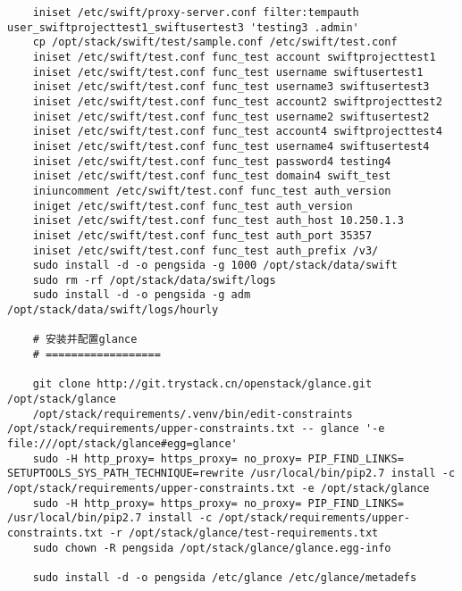 \documentclass[a4paper,left=1.5cm,right=1.5cm,11pt]{article}
\begin{document}
\begin{lstlisting}
    iniset /etc/swift/proxy-server.conf filter:tempauth user_swiftprojecttest1_swiftusertest3 'testing3 .admin'
	cp /opt/stack/swift/test/sample.conf /etc/swift/test.conf
    iniset /etc/swift/test.conf func_test account swiftprojecttest1
    iniset /etc/swift/test.conf func_test username swiftusertest1
    iniset /etc/swift/test.conf func_test username3 swiftusertest3
    iniset /etc/swift/test.conf func_test account2 swiftprojecttest2
    iniset /etc/swift/test.conf func_test username2 swiftusertest2
    iniset /etc/swift/test.conf func_test account4 swiftprojecttest4
    iniset /etc/swift/test.conf func_test username4 swiftusertest4
    iniset /etc/swift/test.conf func_test password4 testing4
    iniset /etc/swift/test.conf func_test domain4 swift_test
	iniuncomment /etc/swift/test.conf func_test auth_version
	iniget /etc/swift/test.conf func_test auth_version
	iniset /etc/swift/test.conf func_test auth_host 10.250.1.3
    iniset /etc/swift/test.conf func_test auth_port 35357
    iniset /etc/swift/test.conf func_test auth_prefix /v3/
	sudo install -d -o pengsida -g 1000 /opt/stack/data/swift
	sudo rm -rf /opt/stack/data/swift/logs
	sudo install -d -o pengsida -g adm /opt/stack/data/swift/logs/hourly

	# 安装并配置glance
	# ==================

	git clone http://git.trystack.cn/openstack/glance.git /opt/stack/glance
	/opt/stack/requirements/.venv/bin/edit-constraints /opt/stack/requirements/upper-constraints.txt -- glance '-e file:///opt/stack/glance#egg=glance'
	sudo -H http_proxy= https_proxy= no_proxy= PIP_FIND_LINKS= SETUPTOOLS_SYS_PATH_TECHNIQUE=rewrite /usr/local/bin/pip2.7 install -c /opt/stack/requirements/upper-constraints.txt -e /opt/stack/glance
	sudo -H http_proxy= https_proxy= no_proxy= PIP_FIND_LINKS= /usr/local/bin/pip2.7 install -c /opt/stack/requirements/upper-constraints.txt -r /opt/stack/glance/test-requirements.txt
	sudo chown -R pengsida /opt/stack/glance/glance.egg-info

	sudo install -d -o pengsida /etc/glance /etc/glance/metadefs


\end{lstlisting}
\end{document}
